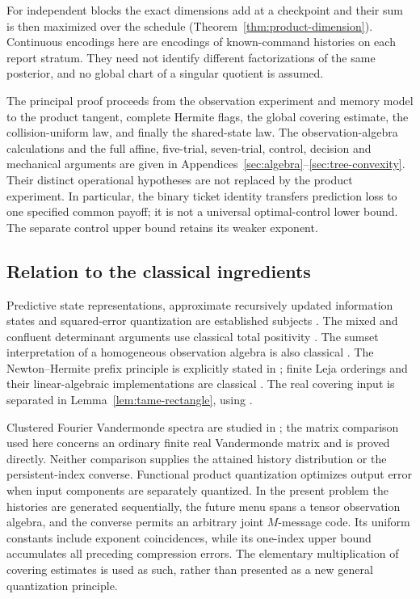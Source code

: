 For independent blocks the exact dimensions add at a checkpoint and their
sum is then maximized over the schedule
(Theorem~\ref{thm:product-dimension}). Continuous encodings here are
encodings of known-command histories on each report stratum. They need
not identify different factorizations of the same posterior, and no
global chart of a singular quotient is assumed.

The principal proof proceeds from the observation experiment and memory
model to the product tangent, complete Hermite flags, the global covering
estimate, the collision-uniform law, and finally the shared-state law.
The observation-algebra calculations and the full affine, five-trial,
seven-trial, control, decision and mechanical arguments are given in
Appendices~\ref{sec:algebra}--\ref{sec:tree-convexity}. Their distinct
operational hypotheses are not replaced by the product experiment.
In particular, the binary ticket identity transfers prediction loss to
one specified common payoff; it is not a universal optimal-control lower
bound. The separate control upper bound retains its weaker exponent.

\subsection{Relation to the classical ingredients}
Predictive state representations, approximate recursively updated
information states and squared-error quantization are established subjects
\cite{LittmanSutton,Subramanian,KaraYuksel,GrafLuschgy}. The mixed and
confluent determinant arguments use classical total positivity
\cite{Pinkus}. The sumset interpretation of a homogeneous observation
algebra is also classical \cite{EliahouMazumdar,Elias}. The Newton--Hermite
prefix principle is explicitly stated in \cite[Proposition 7, p.~48]{deBoor};
finite Leja orderings and their linear-algebraic implementations are
classical \cite{Leja,BosEtAl}. The real covering input is separated in
Lemma~\ref{lem:tame-rectangle}, using
\cite{YomdinComte,ComteHalupczok,ZhangKileel}.

Clustered Fourier Vandermonde spectra are studied in
\cite[Theorems 2.2--2.3]{BatenkovEtAl}; the matrix comparison used here
concerns an ordinary finite real Vandermonde matrix and is proved directly.
Neither comparison supplies the attained history distribution or the
persistent-index converse. Functional product quantization
\cite[Sections 1.1--1.2 and 5.5]{GuoKaragodinStepanov} optimizes output
error when input components are separately quantized. In the present
problem the histories are generated sequentially, the future menu spans
a tensor observation algebra, and the converse permits an arbitrary
joint $M$-message code. Its uniform constants include exponent
coincidences, while its one-index upper bound accumulates all preceding
compression errors. The elementary multiplication of covering estimates
is used as such, rather than presented as a new general quantization
principle.

